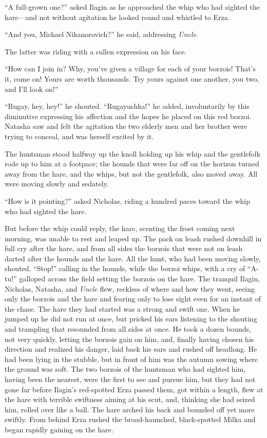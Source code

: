 ``A full-grown one?'' asked Ilagin as he approached the whip who
had sighted the hare---and not without agitation he looked round
and whistled to Erza.

``And you, Michael Nikanorovich?'' he said, addressing
\emph{Uncle}.

The latter was riding with a sullen expression on his face.

``How can I join in? Why, you've given a village for each of your
borzois! That's it, come on! Yours are worth thousands. Try yours
against one another, you two, and I'll look on!''

``Rugay, hey, hey!'' he shouted. ``Rugayushka!'' he added,
involuntarily by this diminutive expressing his affection and the
hopes he placed on this red borzoi. Natasha saw and felt the
agitation the two elderly men and her brother were trying to
conceal, and was herself excited by it.

The huntsman stood halfway up the knoll holding up his whip and
the gentlefolk rode up to him at a footpace; the hounds that were
far off on the horizon turned away from the hare, and the whips,
but not the gentlefolk, also moved away. All were moving slowly
and sedately.

``How is it pointing?'' asked Nicholas, riding a hundred paces
toward the whip who had sighted the hare.

But before the whip could reply, the hare, scenting the frost
coming next morning, was unable to rest and leaped up. The pack
on leash rushed downhill in full cry after the hare, and from all
sides the borzois that were not on leash darted after the hounds
and the hare. All the hunt, who had been moving slowly, shouted,
``Stop!'' calling in the hounds, while the borzoi whips, with a
cry of ``A-tu!'' galloped across the field setting the borzois on
the hare. The tranquil Ilagin, Nicholas, Natasha, and
\emph{Uncle} flew, reckless of where and how they went, seeing
only the borzois and the hare and fearing only to lose sight even
for an instant of the chase. The hare they had started was a
strong and swift one. When he jumped up he did not run at once,
but pricked his ears listening to the shouting and trampling that
resounded from all sides at once. He took a dozen bounds, not
very quickly, letting the borzois gain on him, and, finally
having chosen his direction and realized his danger, laid back
his ears and rushed off headlong. He had been lying in the
stubble, but in front of him was the autumn sowing where the
ground was soft. The two borzois of the huntsman who had sighted
him, having been the nearest, were the first to see and pursue
him, but they had not gone far before Ilagin's red-spotted Erza
passed them, got within a length, flew at the hare with terrible
swiftness aiming at his scut, and, thinking she had seized him,
rolled over like a ball. The hare arched his back and bounded off
yet more swiftly. From behind Erza rushed the broad-haunched,
black-spotted Milka and began rapidly gaining on the hare.

